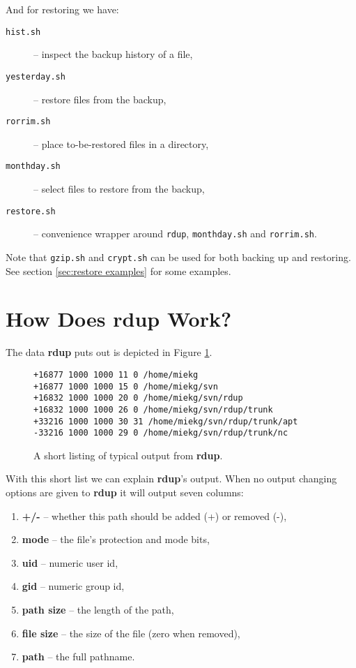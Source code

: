\documentclass[a4paper, openany]{memoir}
\newcommand{\rdup}{\textbf{rdup}}
\newcommand{\cmd}[1]{\texttt{#1}}
\begin{document}
And for restoring we have:
\begin{description}
\item[\cmd{hist.sh}]{-- inspect the backup history of a file,}
\item[\cmd{yesterday.sh}]{-- restore files from the backup,}
\item[\cmd{rorrim.sh}]{-- place to-be-restored files in a directory,}
\item[\cmd{monthday.sh}]{-- select files to restore from the backup,}
\item[\cmd{restore.sh}]{-- convenience wrapper around \cmd{rdup},
\cmd{monthday.sh} and \cmd{rorrim.sh}.} 
\end{description}

Note that \cmd{gzip.sh} and \cmd{crypt.sh} can be used for 
both backing up and restoring. See section \ref{sec:restore examples}
for some examples.

\section{How Does \rdup{} Work?}
The data \rdup{} puts out is depicted in Figure \ref{fig:rdup output}.
\begin{figure}[hbt]
\begin{verbatim}
+16877 1000 1000 11 0 /home/miekg
+16877 1000 1000 15 0 /home/miekg/svn
+16832 1000 1000 20 0 /home/miekg/svn/rdup
+16832 1000 1000 26 0 /home/miekg/svn/rdup/trunk
+33216 1000 1000 30 31 /home/miekg/svn/rdup/trunk/apt
-33216 1000 1000 29 0 /home/miekg/svn/rdup/trunk/nc
\end{verbatim}
\caption{A short listing of typical output from \rdup.}
\label{fig:rdup output}
\end{figure}

With this short list we can explain \rdup's output. When no
output changing options are given to \rdup{} it will output seven
columns:
\begin{enumerate}
\item{\textbf{+/-} -- whether this path should be added (+) or removed
(-),}
\item{\textbf{mode} -- the file's protection and mode bits,}
\item{\textbf{uid} -- numeric user id,}
\item{\textbf{gid} -- numeric group id,}
\item{\textbf{path size} -- the length of the path,}
\item{\textbf{file size} -- the size of the file (zero when removed),}
\item{\textbf{path} -- the full pathname.}
\end{enumerate}
\end{document}
